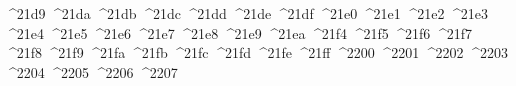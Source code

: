{  ^^^^21d9%
  ^^^^21da%
  ^^^^21db%
  ^^^^21dc%
  ^^^^21dd%
  ^^^^21de%
  ^^^^21df%
  ^^^^21e0%
  ^^^^21e1%
  ^^^^21e2%
  ^^^^21e3%
  ^^^^21e4%
  ^^^^21e5%
  ^^^^21e6%
  ^^^^21e7%
  ^^^^21e8%
  ^^^^21e9%
  ^^^^21ea%
  ^^^^21f4%
  ^^^^21f5%
  ^^^^21f6%
  ^^^^21f7%
  ^^^^21f8%
  ^^^^21f9%
  ^^^^21fa%
  ^^^^21fb%
  ^^^^21fc%
  ^^^^21fd%
  ^^^^21fe%
  ^^^^21ff%
  ^^^^2200%
  ^^^^2201%
  ^^^^2202%
  ^^^^2203%
  ^^^^2204%
  ^^^^2205%
  ^^^^2206%
  ^^^^2207%
}
